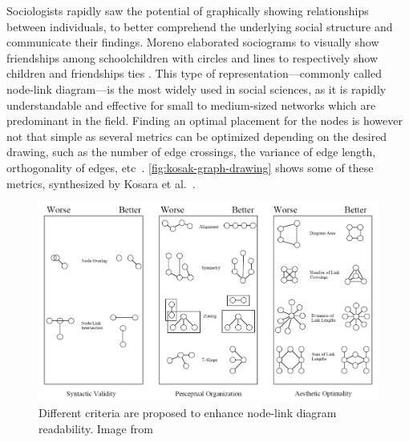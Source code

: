 Sociologists rapidly saw the potential of graphically showing relationships between individuals, to better comprehend the underlying social structure and communicate their findings\cite{freemanVisualizingSocialNetworks2000}.
Moreno elaborated sociograms to visually show friendships among schoolchildren with circles and lines to respectively show children and friendships ties \cite{morenoWhoShallSurvive1934}.
This type of representation---commonly called node-link diagram---is the most widely used in social sciences, as it is rapidly understandable and effective for small to medium-sized networks which are predominant in the field.
Finding an optimal placement for the nodes is however not that simple as several metrics can be optimized depending on the desired drawing, such as the number of edge crossings, the variance of edge length, orthogonality of edges, etc~\cite{cristofoliPrincipesUsagesDessins, kosakAutomatingLayoutNetwork1994}. \autoref{fig:kosak-graph-drawing} shows some of these metrics, synthesized by Kosara et al.~\cite{kosakAutomatingLayoutNetwork1994}.
\begin{figure}
    \centering %
    \includegraphics[width=1\textwidth]{static/figures/RelatedWork/Kosak-nodelinkdiagramMetrics}
    \caption{Different criteria are proposed to enhance node-link diagram readability. Image from \cite{kosakAutomatingLayoutNetwork1994}}
    \label{fig:kosak-graph-drawing}
\end{figure}
